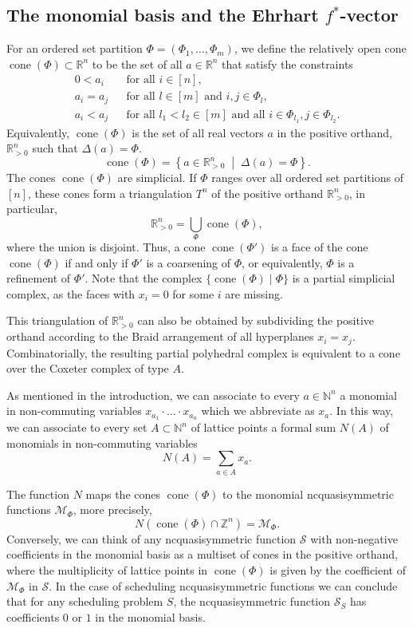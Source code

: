 \documentclass[12pt,reqno]{amsart}
\numberwithin{definition}{section}
\theoremstyle{definition}
\newcommand{\RR}{\mathbb{R}}
\newcommand{\NN}{\mathbb{N}}
\newcommand{\ZZ}{\mathbb{Z}}
\newcommand{\SSS}{\mathcal{S}}
\newcommand{\cone}{\operatorname{cone}}
\newcommand{\mset}[2]{ \left\{ #1 \; \middle| \; #2 \right\}}
\newcommand{\ncM}{\mathcal{M}}
\begin{document}
\subsection{The monomial basis and the Ehrhart $f^*$-vector}

For an ordered set partition $\Phi=(\Phi_1,\ldots,\Phi_m)$, we define the relatively open cone $\cone(\Phi)\subset\RR^n$ to be the set of all $a\in\RR^n$ that satisfy the constraints
\begin{eqnarray*}
0 < a_i && \text{for all $i\in[n]$}, \\
a_i = a_j && \text{for all $l\in[m]$ and $i,j\in\Phi_l$}, \\
a_i < a_j && \text{for all $l_1 < l_2\in[m]$ and all $i\in\Phi_{l_1}, j\in\Phi_{l_2}$}.
\end{eqnarray*}
Equivalently, $\cone(\Phi)$ is the set of all real vectors $a$ in the positive orthand, $\RR_{> 0}^n$ such that $\Delta(a)=\Phi$. 
\[
\cone(\Phi) = \mset{a\in\RR_{> 0}^n}{\Delta(a)=\Phi}.
\]
The cones $\cone(\Phi)$ are simplicial. If $\Phi$ ranges over all ordered set partitions of $[n]$, these cones form a triangulation $T^n$ of the positive orthand $\RR_{> 0}^n$, in particular,
\[
  \RR_{> 0}^n = \bigcup_\Phi \cone(\Phi),
\]
where the union is disjoint. Thus, a cone $\cone(\Phi')$ is a face of the cone $\cone(\Phi)$ if and only if $\Phi'$ is a coarsening of $\Phi$, or equivalently, $\Phi$ is a refinement of $\Phi'$. Note that the complex $\{\cone(\Phi) \;|\; \Phi\}$ is a partial simplicial complex, as the faces with $x_i=0$ for some $i$ are missing.

This triangulation of $\RR_{> 0}^n$ can also be obtained by subdividing the positive orthand according to the Braid arrangement of all hyperplanes $x_i=x_j$. Combinatorially, the resulting partial polyhedral complex is equivalent to a cone over the Coxeter complex of type $A$. 

As mentioned in the introduction, we can associate to every $a\in\NN^n$ a monomial in non-commuting variables $x_{a_1}\cdot\ldots\cdot x_{a_n}$ which we abbreviate as $x_a$. In this way, we can associate to every set $A\subset\NN^n$ of lattice points a formal sum $N(A)$ of monomials in non-commuting variables
\[
  N(A) = \sum_{a\in A} x_a.
\]

The function $N$ maps the cones $\cone(\Phi)$ to the monomial ncquasisymmetric functions $\ncM_\Phi$, more precisely,
\[
  N(\cone(\Phi)\cap\ZZ^n) = \ncM_\Phi.
\]
Conversely, we can think of any ncquasisymmetric function $\SSS$ with non-negative coefficients in the monomial basis as a multiset of cones in the positive orthand, where the multiplicity of lattice points in $\cone(\Phi)$ is given by the coefficient of $\ncM_\Phi$ in $\SSS$. In the case of scheduling ncquasisymmetric functions we can conclude that for any scheduling problem $S$, the ncquasisymmetric function $\SSS_S$ has coefficients $0$ or $1$ in the monomial basis.
\end{document}
